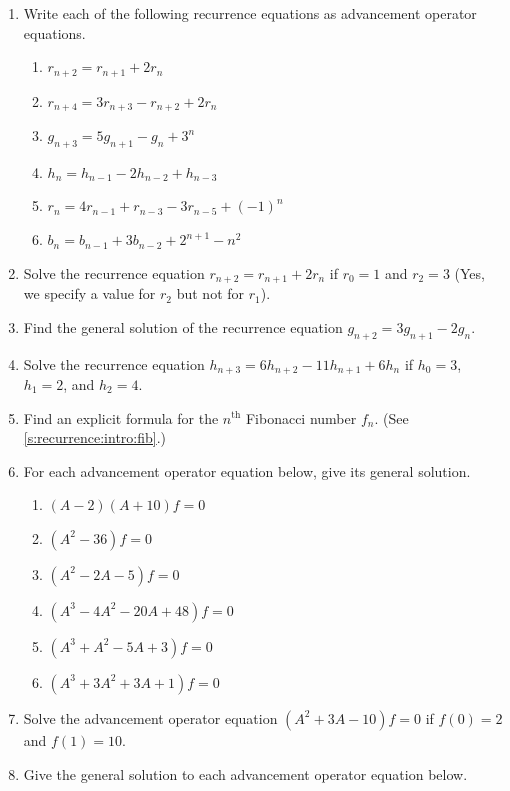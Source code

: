 \begin{enumerate}
\item Write each of the following recurrence equations as advancement
  operator equations.
  \begin{multicols}{2}
    \begin{enumerate}
    \item $r_{n+2} = r_{n+1}+2r_n$
    \item $r_{n+4}=3r_{n+3} - r_{n+2}+2r_n$
    \item $g_{n+3} = 5 g_{n+1} - g_n + 3^n$
    \item $h_n = h_{n-1} - 2h_{n-2} + h_{n-3}$
    \item $r_n = 4r_{n-1} + r_{n-3} - 3 r_{n-5} + (-1)^n$
    \item $b_n = b_{n-1} + 3b_{n-2} + 2^{n+1} - n^2$
    \end{enumerate}
  \end{multicols}
\item Solve the recurrence equation $r_{n+2} = r_{n+1} + 2r_n$ if
  $r_0=1$ and $r_2=3$ (Yes, we specify a value for $r_2$ but not for
  $r_1$).
\item Find the general solution of the recurrence equation $g_{n+2} =
  3g_{n+1}-2g_n$.
\item Solve the recurrence equation $h_{n+3} = 6h_{n+2}-11h_{n+1} +
  6h_n$ if $h_0=3$, $h_1=2$, and $h_2=4$.
\item Find an explicit formula for the $n^\text{th}$ Fibonacci number
  $f_n$. (See \autoref{s:recurrence:intro:fib}.)
\item For each advancement operator equation below, give its general
  solution.
  \begin{multicols}{2}
    \begin{enumerate}
    \item $(A-2)(A+10)f=0$
    \item $(A^2-36)f=0$
    \item $(A^2-2A-5)f=0$
    \item $(A^3-4 A^2-20 A+48)f=0$
    \item $(A^3 +A^2-5A+ 3)f=0$
    \item $(A^3+3 A^2+3 A+1)f=0$
    \end{enumerate}
 \end{multicols}
\item Solve the advancement operator equation $(A^2+3 A-10)f=0$ if
  $f(0)=2$ and $f(1)=10$.
\item Give the general solution to each advancement operator equation
  below.

\end{enumerate}
